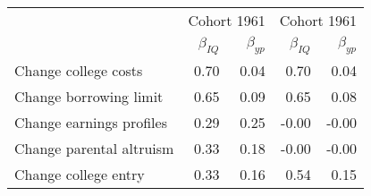 \begin{tabular}{lrrrr}
\hline
   & \multicolumn{2}{|c|}{Cohort 1961} & \multicolumn{2}{|c|}{Cohort 1961} \\ 
 & $\beta_{IQ}$  & $\beta_{yp}$  & $\beta_{IQ}$  & $\beta_{yp}$  \\ 
\hline
Change college costs & 0.70  & 0.04  & 0.70  & 0.04  \\ 
Change borrowing limit & 0.65  & 0.09  & 0.65  & 0.08  \\ 
Change earnings profiles & 0.29  & 0.25  & -0.00  & -0.00  \\ 
Change parental altruism & 0.33  & 0.18  & -0.00  & -0.00  \\ 
Change college entry & 0.33  & 0.16  & 0.54  & 0.15  \\ 
\hline
\end{tabular}%
